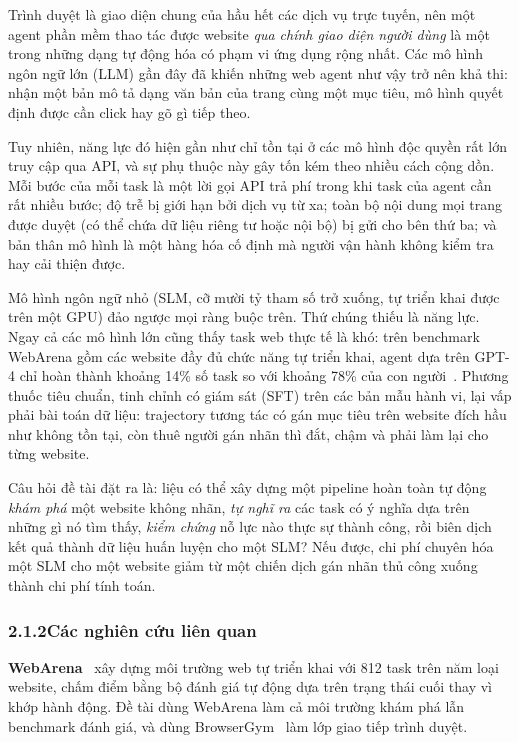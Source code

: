 Trình duyệt là giao diện chung của hầu hết các dịch vụ trực tuyến, nên một
agent phần mềm thao tác được website \emph{qua chính giao diện người dùng} là
một trong những dạng tự động hóa có phạm vi ứng dụng rộng nhất. Các mô hình
ngôn ngữ lớn (LLM) gần đây đã khiến những web agent như vậy trở nên khả thi:
nhận một bản mô tả dạng văn bản của trang cùng một mục tiêu, mô hình quyết
định được cần click hay gõ gì tiếp theo.

Tuy nhiên, năng lực đó hiện gần như chỉ tồn tại ở các mô hình độc quyền rất
lớn truy cập qua API, và sự phụ thuộc này gây tốn kém theo nhiều cách cộng
dồn. Mỗi bước của mỗi task là một lời gọi API trả phí trong khi task của agent
cần rất nhiều bước; độ trễ bị giới hạn bởi dịch vụ từ xa; toàn bộ nội dung mọi
trang được duyệt (có thể chứa dữ liệu riêng tư hoặc nội bộ) bị gửi cho
bên thứ ba; và bản thân mô hình là một hàng hóa cố định mà người vận hành
không kiểm tra hay cải thiện được.

Mô hình ngôn ngữ nhỏ (SLM, cỡ mười tỷ tham số trở xuống, tự triển khai
được trên một GPU) đảo ngược mọi ràng buộc trên. Thứ chúng thiếu là năng
lực. Ngay cả các mô hình lớn cũng thấy task web thực tế là khó: trên benchmark
WebArena gồm các website đầy đủ chức năng tự triển khai, agent dựa trên GPT-4
chỉ hoàn thành khoảng 14\% số task so với khoảng 78\% của con
người~\cite{zhou2024webarena}. Phương thuốc tiêu chuẩn, tinh chỉnh có giám
sát (SFT) trên các bản mẫu hành vi, lại vấp phải bài toán dữ liệu:
trajectory tương tác có gán mục tiêu trên website đích hầu như không tồn tại,
còn thuê người gán nhãn thì đắt, chậm và phải làm lại cho từng website.

Câu hỏi đề tài đặt ra là: liệu có thể xây dựng một pipeline hoàn toàn tự động
\emph{khám phá} một website không nhãn, \emph{tự nghĩ ra} các task có ý nghĩa
dựa trên những gì nó tìm thấy, \emph{kiểm chứng} nỗ lực nào thực sự thành
công, rồi biên dịch kết quả thành dữ liệu huấn luyện cho một SLM? Nếu được,
chi phí chuyên hóa một SLM cho một website giảm từ một chiến dịch gán nhãn thủ
công xuống thành chi phí tính toán.

\subsubsection*{2.1.2\quad Các nghiên cứu liên quan}

\textbf{WebArena}~\cite{zhou2024webarena} xây dựng môi trường web tự triển
khai với 812 task trên năm loại website, chấm điểm bằng bộ đánh giá tự động
dựa trên trạng thái cuối thay vì khớp hành động. Đề tài dùng WebArena làm cả
môi trường khám phá lẫn benchmark đánh giá, và dùng
BrowserGym~\cite{dechezelles2025browsergym} làm lớp giao tiếp trình duyệt.

